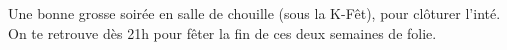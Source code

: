 Une bonne grosse soirée en salle de chouille (sous la K-Fêt), pour clôturer
l'inté. On te retrouve dès 21h pour fêter la fin de ces deux semaines de folie.

